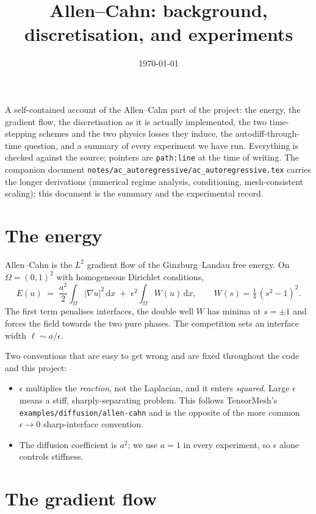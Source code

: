 \documentclass[11pt]{article}
\title{Allen--Cahn: background, discretisation, and experiments}
\date{\today}
\begin{document}
\maketitle

\noindent
A self-contained account of the Allen--Cahn part of the project: the energy, the gradient flow,
the discretisation as it is actually implemented, the two time-stepping schemes and the two
physics losses they induce, the autodiff-through-time question, and a summary of every experiment
we have run. Everything is checked against the source; pointers are \texttt{path:line} at the time
of writing. The companion document \texttt{notes/ac\_autoregressive/ac\_autoregressive.tex} carries
the longer derivations (numerical regime analysis, conditioning, mesh-consistent scaling); this
document is the summary and the experimental record.

\section{The energy}

Allen--Cahn is the $L^2$ gradient flow of the Ginzburg--Landau free energy. On $\Omega=(0,1)^2$
with homogeneous Dirichlet conditions,
\begin{equation}\label{eq:energy}
   E(u) \;=\; \frac{a^2}{2}\int_\Omega |\nabla u|^2\,\mathrm dx
            \;+\; \epsilon^2\!\int_\Omega W(u)\,\mathrm dx,
   \qquad
   W(s) = \tfrac14\,(s^2-1)^2 .
\end{equation}
The first term penalises interfaces, the double well $W$ has minima at $s=\pm1$ and forces the
field towards the two pure phases. The competition sets an interface width $\ell \sim a/\epsilon$.

Two conventions that are easy to get wrong and are fixed throughout the code and this project:
\begin{itemize}
   \item $\epsilon$ multiplies the \emph{reaction}, not the Laplacian, and it enters
         \emph{squared}. Large $\epsilon$ means a stiff, sharply-separating problem. This follows
         TensorMesh's \texttt{examples/diffusion/allen-cahn} and is the opposite of the more common
         $\epsilon\to0$ sharp-interface convention.
   \item The diffusion coefficient is $a^2$; we use $a=1$ in every experiment, so $\epsilon$ alone
         controls stiffness.
\end{itemize}

\section{The gradient flow}
\end{document}
